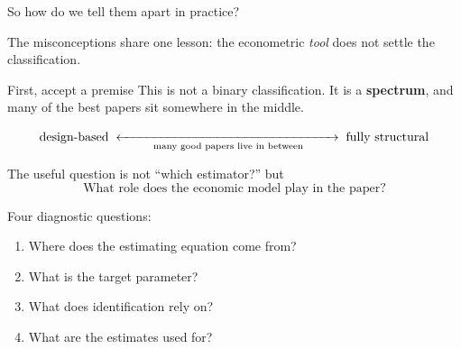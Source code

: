 \documentclass[aspectratio=169,11pt]{beamer}
\begin{document}
\begin{frame}{So how do we tell them apart in practice?}

The misconceptions share one lesson: the econometric \emph{tool}
does not settle the classification.

\vspace{0.3em}

\begin{alertblock}{First, accept a premise}
This is not a binary classification. It is a \textbf{spectrum},
and many of the best papers sit somewhere in the middle.
\end{alertblock}

\[
\text{design-based}
\;\xleftrightarrow[\text{many good papers live in between}]{\hspace{6cm}}\;
\text{fully structural}
\]

The useful question is not ``which estimator?'' but
\[
\boxed{\text{What role does the economic model play in the paper?}}
\]

Four diagnostic questions:
\begin{enumerate}
    \item Where does the estimating equation come from?
    \item What is the target parameter?
    \item What does identification rely on?
    \item What are the estimates used for?
\end{enumerate}

\end{frame}
\end{document}

